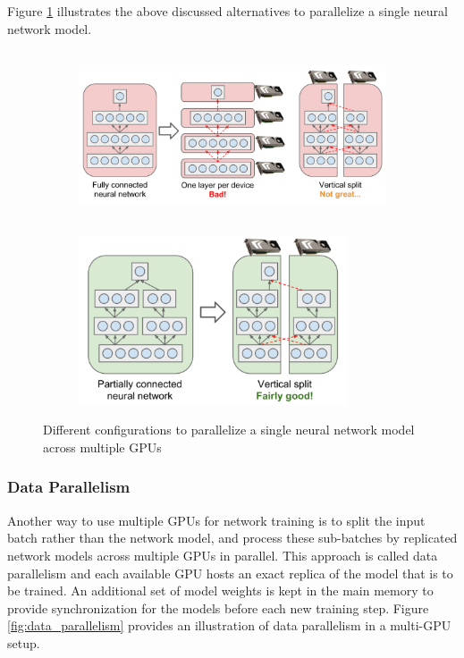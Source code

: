 Figure \ref{fig:model_parallelism} illustrates the above discussed alternatives to parallelize a single neural network model.

\begin{figure}[H]
    \begin{subfigure}[c]{\textwidth}
        \centering
        \includegraphics[height=5cm]{img_approach/model_parallelism1}
        \vspace{0.5cm}
    \end{subfigure}
    \begin{subfigure}[c]{\textwidth}
        \centering
        \includegraphics[height=5cm]{img_approach/model_parallelism2}
    \end{subfigure}
    \caption{Different configurations to parallelize a single neural network model across multiple GPUs \cite{geron_hands-machine_2017}}
    \label{fig:model_parallelism}
\end{figure}

\subsubsection{Data Parallelism}
Another way to use multiple GPUs for network training is to split the input batch rather than the network model, and process these sub-batches by replicated network models across multiple GPUs in parallel.
This approach is called data parallelism and each available GPU hosts an exact replica of the model that is to be trained.
An additional set of model weights is kept in the main memory to provide synchronization for the models before each new training step.
Figure \ref{fig:data_parallelism} provides an illustration of data parallelism in a multi-GPU setup.

